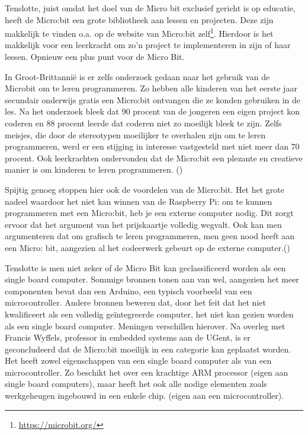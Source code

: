 Tenslotte, juist omdat het doel van de Micro bit exclusief gericht is op educatie, heeft de Micro:bit een grote bibliotheek aan lessen en projecten. Deze zijn makkelijk te vinden o.a. op de  website van Micro:bit zelf\footnote{\url{https://microbit.org/}}. Hierdoor is het makkelijk voor een leerkracht om zo’n project te implementeren in zijn of haar lessen. Opnieuw een plus punt voor de Micro Bit.

In Groot-Brittannië is er zelfs onderzoek gedaan naar het gebruik van de Microbit om te leren programmeren. Zo hebben alle kinderen van het eerste jaar secundair onderwijs gratis een Micro:bit ontvangen die ze konden gebruiken in de les. Na het onderzoek bleek dat 90 procent van de jongeren een eigen project kon coderen en 88 procent leerde dat coderen niet zo moeilijk bleek te zijn. Zelfs meisjes, die door de stereotypen moeilijker te overhalen zijn om te leren programmeren, werd er een stijging in interesse vastgesteld met niet meer dan 70 procent. Ook leerkrachten ondervonden dat de Micro:bit een plezante en creatieve manier is om kinderen te leren programmeren. (\cite{IW2017})

Spijtig genoeg stoppen hier ook de voordelen van de Micro:bit. Het het grote nadeel waardoor het niet kan winnen van de Raspberry Pi: om te kunnen programmeren met een Micro:bit, heb je een externe computer nodig. Dit zorgt ervoor dat het argument van het prijskaartje volledig wegvalt. Ook kan men argumenteren dat om grafisch te leren programmeren, men geen nood heeft aan een Micro: bit, aangezien al het codeerwerk gebeurt op de externe computer.(\cite{Singapore})

Tenslotte is men niet zeker of de Micro Bit kan geclassificeerd worden als een single board computer. Sommige bronnen tonen aan van wel, aangezien het meer componenten bevat dan een Arduino, een typisch voorbeeld van een microcontroller. Andere bronnen beweren dat, door het feit dat het niet kwalificeert als een volledig geïntegreerde computer, het niet kan gezien worden als een single board computer. Meningen verschillen hierover. 
Na overleg met Francis Wyffels, professor in embedded systems aan de UGent, is er geconcludeerd dat de Micro:bit moeilijk in een categorie kan geplaatst worden. Het heeft zowel eigenschappen van een single board computer als van een microcontroller. Zo beschikt het over een krachtige ARM processor (eigen aan single board computers), maar heeft het ook alle nodige elementen zoals werkgeheugen ingebouwd in een enkele chip. (eigen aan een microcontroller). 

